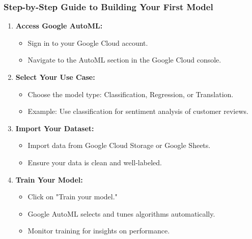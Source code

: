 \documentclass[aspectratio=169]{beamer}
\begin{document}
\begin{frame}[fragile]
    \frametitle{Step-by-Step Guide to Building Your First Model}
    \begin{enumerate}
        \item \textbf{Access Google AutoML:}
        \begin{itemize}
            \item Sign in to your Google Cloud account.
            \item Navigate to the AutoML section in the Google Cloud console.
        \end{itemize}
        
        \item \textbf{Select Your Use Case:}
        \begin{itemize}
            \item Choose the model type: Classification, Regression, or Translation.
            \item Example: Use classification for sentiment analysis of customer reviews.
        \end{itemize}
        
        \item \textbf{Import Your Dataset:}
        \begin{itemize}
            \item Import data from Google Cloud Storage or Google Sheets.
            \item Ensure your data is clean and well-labeled.
        \end{itemize}
        
        \item \textbf{Train Your Model:}
        \begin{itemize}
            \item Click on "Train your model."
            \item Google AutoML selects and tunes algorithms automatically.
            \item Monitor training for insights on performance.
        \end{itemize}
        

\end{enumerate}
\end{frame}
\end{document}
